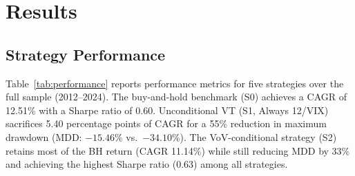 \documentclass[12pt,a4paper]{article}
\begin{document}
\section{Results}
\label{sec:results}

\subsection{Strategy Performance}

Table~\ref{tab:performance} reports performance metrics for five strategies over the full sample (2012--2024). The buy-and-hold benchmark (S0) achieves a CAGR of 12.51\% with a Sharpe ratio of 0.60. Unconditional VT (S1, Always 12/VIX) sacrifices 5.40 percentage points of CAGR for a 55\% reduction in maximum drawdown (MDD: $-15.46\%$ vs.\ $-34.10\%$). The VoV-conditional strategy (S2) retains most of the BH return (CAGR 11.14\%) while still reducing MDD by 33\% and achieving the highest Sharpe ratio (0.63) among all strategies.
\end{document}
